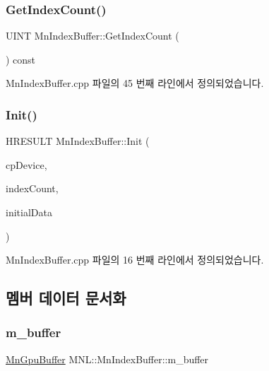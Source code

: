 \subsubsection{\texorpdfstring{Get\+Index\+Count()}{GetIndexCount()}}
{\footnotesize\ttfamily U\+I\+NT Mn\+Index\+Buffer\+::\+Get\+Index\+Count (\begin{DoxyParamCaption}{ }\end{DoxyParamCaption}) const}



Mn\+Index\+Buffer.\+cpp 파일의 45 번째 라인에서 정의되었습니다.

\mbox{\label{class_m_n_l_1_1_mn_index_buffer_ac5b1d0d65818b869497f265642fae509}} 
\subsubsection{\texorpdfstring{Init()}{Init()}}
{\footnotesize\ttfamily H\+R\+E\+S\+U\+LT Mn\+Index\+Buffer\+::\+Init (\begin{DoxyParamCaption}\item[{\hyperlink{namespace_m_n_l_a1eec210db8f309a4a9ac0d9658784c31}{C\+P\+D3\+D\+Device}}]{cp\+Device,  }\item[{U\+I\+NT}]{index\+Count,  }\item[{const D3\+D11\+\_\+\+S\+U\+B\+R\+E\+S\+O\+U\+R\+C\+E\+\_\+\+D\+A\+TA $\ast$}]{initial\+Data }\end{DoxyParamCaption})}



Mn\+Index\+Buffer.\+cpp 파일의 16 번째 라인에서 정의되었습니다.



\subsection{멤버 데이터 문서화}
\mbox{\label{class_m_n_l_1_1_mn_index_buffer_a1dd52fcc71e02db79ee8b693c39423a8}} 
\subsubsection{\texorpdfstring{m\+\_\+buffer}{m\_buffer}}
{\footnotesize\ttfamily \hyperlink{class_m_n_l_1_1_mn_gpu_buffer}{Mn\+Gpu\+Buffer} M\+N\+L\+::\+Mn\+Index\+Buffer\+::m\+\_\+buffer\hspace{0.3cm}{\ttfamily [private]}}




